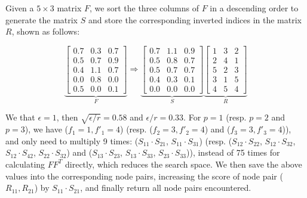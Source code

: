 \vspace{1ex}
\noindent\begin{example}
\label{ex_top_k}
Given a $5 \times 3$ matrix $F$, we sort the three columns of $F$ in a
descending order to generate the matrix $S$ and store the corresponding
inverted indices in the matrix $R$, shown as follows:
\begin{small}
\[\underbrace{
  \begin{bmatrix}
    0.7 & 0.3 & 0.7 \\
    0.5 & 0.7 & 0.9 \\
    0.4 & 1.1 & 0.7 \\
    0.0 & 0.8 & 0.0 \\
    0.5 & 0.0 & 0.1
  \end{bmatrix}}_{F}
  \Longrightarrow
  \underbrace{\begin{bmatrix}
    0.7 & 1.1 & 0.9 \\
    0.5 & 0.8 & 0.7 \\
    0.5 & 0.7 & 0.7 \\
    0.4 & 0.3 & 0.1 \\
    0.0 & 0.0 & 0.0
  \end{bmatrix}}_{S}
  \underbrace{\begin{bmatrix}
    1 & 3 & 2 \\
    2 & 4 & 1 \\
    5 & 2 & 3 \\
    3 & 1 & 5 \\
    4 & 5 & 4
  \end{bmatrix}}_{R}
\]
\end{small}
We \kwlog that $\epsilon = 1$, then $\sqrt{ \epsilon / r} = 0.58$ and $\epsilon / r = 0.33$.
For $p = 1$ (resp. $p = 2$ and $p = 3$), we have ($f_1 = 1, f'_1 = 4$)
(resp. ($f_2 = 3, f'_2 = 4$) and ($f_3 = 3, f'_3 = 4$)), and only need to multiply
9 times: ($S_{11} \cdot S_{21}$,
$S_{11} \cdot S_{31}$) (resp. ($S_{12} \cdot S_{22}$, $S_{12} \cdot S_{32}$, $S_{12} \cdot S_{42}$,
$S_{22} \cdot S_{32}$) and ($S_{13} \cdot S_{23}$, $S_{13} \cdot S_{33}$, $S_{23} \cdot S_{33}$)), instead of 75 times for calculating $FF^T$ directly, which reduces
the search space. We then save the above values into the corresponding node pairs,
\eg increasing the score of node pair ($R_{11}, R_{21}$) by $S_{11} \cdot S_{21}$,
and finally return all node pairs encountered.
\end{example} 
\vspace{1ex}


